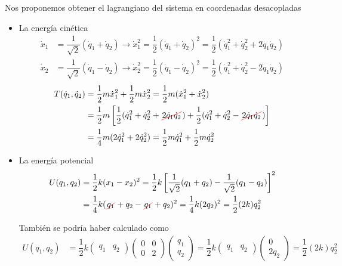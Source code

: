 Nos proponemos obtener el lagrangiano del sistema en coordenadas desacopladas 
\begin{itemize}
\item La energía cinética
  \begin{align*}
    \dot{x}_1 &= \dfrac{1}{\sqrt{2}} (\dot{q}_1 + \dot{q}_2)
    \longrightarrow
    \dot{x}_1^2 = \dfrac{1}{2} (\dot{q}_1 + \dot{q}_2)^2
    = \dfrac{1}{2} (\dot{q}_1^2 + \dot{q}_2^2 + 2\dot{q}_1\dot{q}_2)\\            
    \dot{x}_2 &= \dfrac{1}{\sqrt{2}} (\dot{q}_1 - \dot{q}_2)
    \longrightarrow
    \dot{x}_2^2 = \dfrac{1}{2} (\dot{q}_1 - \dot{q}_2)^2
     = \dfrac{1}{2} (\dot{q}_1^2 + \dot{q}_2^2 - 2\dot{q}_1\dot{q}_2)
  \end{align*}
  \begin{align*}
    T(\dot{q}_1,\dot{q}_2)
    &=
    \dfrac{1}{2} m \dot{x}_1^2 + \dfrac{1}{2} m \dot{x}_2^2
    =
    \dfrac{1}{2} m (\dot{x}_1^2 + \dot{x}_2^2)\\
    &= \dfrac{1}{2} m
    \left[
      \dfrac{1}{2}(\dot{q}_1^2+\dot{q}_2^2+\cancelout{2\dot{q}_1\dot{q}_2})
      + \dfrac{1}{2}(\dot{q}_1^2+\dot{q}_2^2-\cancelout{2\dot{q}_1\dot{q}_2})
      \right]\\
    &=
      \dfrac{1}{4}m(2\dot{q}_1^2 + 2\dot{q}_2^2)
      = \dfrac{1}{2}m\dot{q}_1^2 + \dfrac{1}{2}m\dot{q}_2^2
  \end{align*}
  
\item La energía potencial
  \begin{align*}
    U(q_1,q_2)
    &=
    \dfrac{1}{2}k(x_1-x_2)^2
    = \dfrac{1}{2}k
    \left[\dfrac{1}{\sqrt{2}}(q_1+q_2)-\dfrac{1}{\sqrt{2}}(q_1-q_2)\right]^2\\
    &=
      \dfrac{1}{4}k(\cancelout{q_1}+q_2-\cancelout{q_1}+q_2)^2
      =
      \dfrac{1}{4}k(2q_2)^2 = \dfrac{1}{2}(2k)q_2^2
  \end{align*}

  También se podría haber calculado como
  \begin{align*}
    U(q_1,q_2)
    &=
    \dfrac{1}{2}k
    \begin{pmatrix} q_1 & q_2 \end{pmatrix}
    \begin{pmatrix}
      0 & 0 \\ 0 & 2
    \end{pmatrix}
    \begin{pmatrix}q_1 \\ q_2 \end{pmatrix}
    =
    \dfrac{1}{2}k
    \begin{pmatrix}q_1 & q_2 \end{pmatrix}
    \begin{pmatrix} 0 \\ 2q_2 \end{pmatrix}
    =
    \dfrac{1}{2} (2k) q_2^2
  \end{align*}
  
   
\end{itemize}

